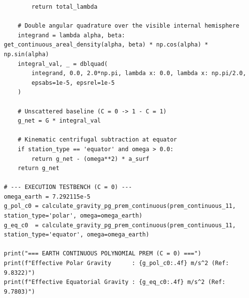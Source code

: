 \begin{lstlisting}
        return total_lambda

    # Double angular quadrature over the visible internal hemisphere
    integrand = lambda alpha, beta: get_continuous_areal_density(alpha, beta) * np.cos(alpha) * np.sin(alpha)
    integral_val, _ = dblquad(
        integrand, 0.0, 2.0*np.pi, lambda x: 0.0, lambda x: np.pi/2.0,
        epsabs=1e-5, epsrel=1e-5
    )
    
    # Unscattered baseline (C = 0 -> 1 - C = 1)
    g_net = G * integral_val
    
    # Kinematic centrifugal subtraction at equator
    if station_type == 'equator' and omega > 0.0:
        return g_net - (omega**2) * a_surf
    return g_net

# --- EXECUTION TESTBENCH (C = 0) ---
omega_earth = 7.292115e-5
g_pol_c0 = calculate_gravity_pg_prem_continuous(prem_continuous_11, station_type='polar', omega=omega_earth)
g_eq_c0  = calculate_gravity_pg_prem_continuous(prem_continuous_11, station_type='equator', omega=omega_earth)

print("=== EARTH CONTINUOUS POLYNOMIAL PREM (C = 0) ===")
print(f"Effective Polar Gravity      : {g_pol_c0:.4f} m/s^2 (Ref: 9.8322)")
print(f"Effective Equatorial Gravity : {g_eq_c0:.4f} m/s^2 (Ref: 9.7803)")
\end{lstlisting}

